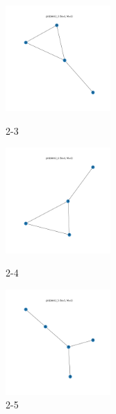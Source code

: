 \documentclass[a4paper, 10pt, dvipdfmx]{jlreq}
\begin{document}
\begin{figure}[htbp]
  \begin{minipage}{0.33\hsize}
    \begin{center}
      \includegraphics[width=40mm]{img_5/problem2_3.png}
    \end{center}
    \caption{2-3}
  \end{minipage}
  \begin{minipage}{0.33\hsize}
    \begin{center}
      \includegraphics[width=40mm]{img_5/problem2_4.png}
    \end{center}
    \caption{2-4}
  \end{minipage}
  \begin{minipage}{0.33\hsize}
    \begin{center}
      \includegraphics[width=40mm]{img_5/problem2_5.png}
    \end{center}
    \caption{2-5}
  \end{minipage}
\end{figure}
\end{document}
